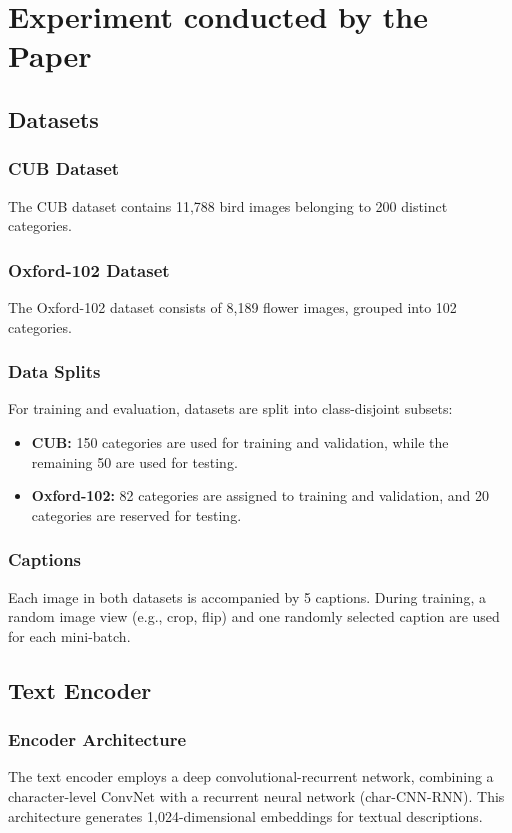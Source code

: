 \section*{Experiment conducted by the Paper}

\subsection*{Datasets}

\subsubsection*{CUB Dataset}
The CUB dataset contains 11,788 bird images belonging to 200 distinct categories. 

\subsubsection*{Oxford-102 Dataset}
The Oxford-102 dataset consists of 8,189 flower images, grouped into 102 categories.

\subsubsection*{Data Splits}
For training and evaluation, datasets are split into class-disjoint subsets:  
\begin{itemize}
    \item \textbf{CUB:} 150 categories are used for training and validation, while the remaining 50 are used for testing.
    \item \textbf{Oxford-102:} 82 categories are assigned to training and validation, and 20 categories are reserved for testing.
\end{itemize}

\subsubsection*{Captions}
Each image in both datasets is accompanied by 5 captions. During training, a random image view (e.g., crop, flip) and one randomly selected caption are used for each mini-batch.

\subsection*{Text Encoder}

\subsubsection*{Encoder Architecture}
The text encoder employs a deep convolutional-recurrent network, combining a character-level ConvNet with a recurrent neural network (char-CNN-RNN). This architecture generates 1,024-dimensional embeddings for textual descriptions.

